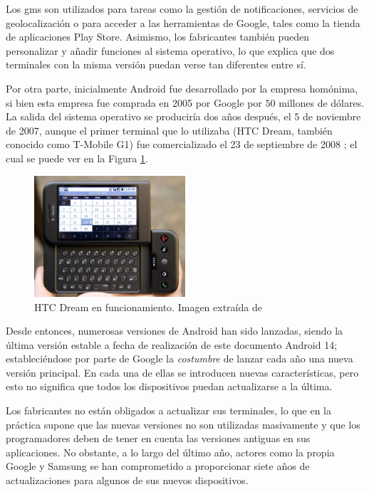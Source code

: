         Los \gls{gms} son utilizados para tareas como la gestión de notificaciones, servicios de geolocalización o para acceder a las herramientas de Google, tales como la tienda de aplicaciones Play Store. Asimismo, los fabricantes también pueden personalizar y añadir funciones al sistema operativo, lo que explica que dos terminales con la misma versión puedan verse tan diferentes entre sí. 
        
        Por otra parte, inicialmente Android fue desarrollado por la empresa homónima, si bien esta empresa fue comprada en 2005 por Google por $50$ millones de dólares. La salida del sistema operativo se produciría dos años después, el 5 de noviembre de 2007, aunque el primer terminal que lo utilizaba (HTC Dream, también conocido como 
        T-Mobile G1) fue comercializado el 23 de septiembre de 2008 \cite{adeva_android_2023} \cite{marquez_asi_2022}; el cual se puede ver en la Figura \ref{figure:android:htc_dream}.

        \begin{figure}[h]
            \centering
            \includegraphics[width=0.5\textwidth]{figures/HTC Dream.jpg}
            \caption[HTC Dream en funcionamiento]{HTC Dream en funcionamiento. Imagen extraída de \cite{oryl_t-mobile_2008}}
            \label{figure:android:htc_dream}
        \end{figure}

        Desde entonces, numerosas versiones de Android han sido lanzadas, siendo la última versión estable a fecha de realización de este documento Android 14; estableciéndose por parte de Google la \textit{costumbre} de lanzar cada año una nueva versión principal. En cada una de ellas se introducen nuevas características, pero esto no significa que todos los dispositivos puedan actualizarse a la última. 
        
        Los fabricantes no están obligados a actualizar sus terminales, lo que en la práctica supone que las nuevas versiones no son utilizadas masivamente y que los programadores deben de tener en cuenta las versiones antiguas en sus aplicaciones. No obstante, a lo largo del último año, actores como la propia Google \cite{ricca_google_2023} y Samsung \cite{ramirez_samsung_2024} se han comprometido a proporcionar siete años de actualizaciones para algunos de sus nuevos dispositivos.
        
